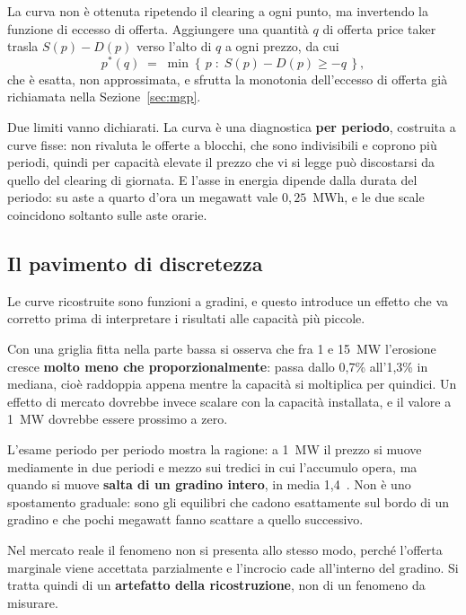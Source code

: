 La curva non \`e ottenuta ripetendo il clearing a ogni punto, ma invertendo la funzione di
eccesso di offerta. Aggiungere una quantit\`a $q$ di offerta price taker trasla $S(p)-D(p)$
verso l'alto di $q$ a ogni prezzo, da cui
\begin{equation}
p^{*}(q) \;=\; \min\left\{\, p \;:\; S(p) - D(p) \ge -q \,\right\},
\label{eq:impatto}
\end{equation}
che \`e esatta, non approssimata, e sfrutta la monotonia dell'eccesso di offerta gi\`a
richiamata nella Sezione~\ref{sec:mgp}.

Due limiti vanno dichiarati. La curva \`e una diagnostica \textbf{per periodo}, costruita a
curve fisse: non rivaluta le offerte a blocchi, che sono indivisibili e coprono pi\`u periodi,
quindi per capacit\`a elevate il prezzo che vi si legge pu\`o discostarsi da quello del
clearing di giornata. E l'asse in energia dipende dalla durata del periodo: su aste a quarto
d'ora un megawatt vale $0{,}25$~MWh, e le due scale coincidono soltanto sulle aste orarie.

\subsection{Il pavimento di discretezza}
\label{sec:pavimento}

Le curve ricostruite sono funzioni a gradini, e questo introduce un effetto che va corretto
prima di interpretare i risultati alle capacit\`a pi\`u piccole.

Con una griglia fitta nella parte bassa si osserva che fra 1 e 15~MW l'erosione cresce
\textbf{molto meno che proporzionalmente}: passa dallo 0{,}7\% all'1{,}3\% in mediana, cio\`e
raddoppia appena mentre la capacit\`a si moltiplica per quindici. Un effetto di mercato
dovrebbe invece scalare con la capacit\`a installata, e il valore a 1~MW dovrebbe essere
prossimo a zero.

L'esame periodo per periodo mostra la ragione: a 1~MW il prezzo si muove mediamente in due
periodi e mezzo sui tredici in cui l'accumulo opera, ma quando si muove \textbf{salta di un
gradino intero}, in media 1{,}4~\euromwh{}. Non \`e uno spostamento graduale: sono gli
equilibri che cadono esattamente sul bordo di un gradino e che pochi megawatt fanno scattare a
quello successivo.

Nel mercato reale il fenomeno non si presenta allo stesso modo, perch\'e l'offerta marginale
viene accettata parzialmente e l'incrocio cade all'interno del gradino. Si tratta quindi di un
\textbf{artefatto della ricostruzione}, non di un fenomeno da misurare.

